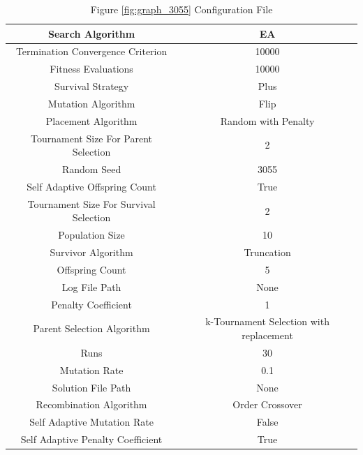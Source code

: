 \documentclass{standalone}
\begin{document}
\begin{table}[!htb]
	\centering
	\caption{Figure \ref{fig:graph_3055} Configuration File}
	\label{tab:graph_3055}
	\begin{tabular}{| c | c |}
		\hline
		Search Algorithm		& EA		 \\
		\hline
		Termination Convergence Criterion		& 10000		 \\
		\hline
		Fitness Evaluations		& 10000		 \\
		\hline
		Survival Strategy		& Plus		 \\
		\hline
		Mutation Algorithm		& Flip		 \\
		\hline
		Placement Algorithm		& Random with Penalty		 \\
		\hline
		Tournament Size For Parent Selection		& 2		 \\
		\hline
		Random Seed		& 3055		 \\
		\hline
		Self Adaptive Offspring Count		& True		 \\
		\hline
		Tournament Size For Survival Selection		& 2		 \\
		\hline
		Population Size		& 10		 \\
		\hline
		Survivor Algorithm		& Truncation		 \\
		\hline
		Offspring Count		& 5		 \\
		\hline
		Log File Path		& None		 \\
		\hline
		Penalty Coefficient		& 1		 \\
		\hline
		Parent Selection Algorithm		& k-Tournament Selection with replacement		 \\
		\hline
		Runs		& 30		 \\
		\hline
		Mutation Rate		& 0.1		 \\
		\hline
		Solution File Path		& None		 \\
		\hline
		Recombination Algorithm		& Order Crossover		 \\
		\hline
		Self Adaptive Mutation Rate		& False		 \\
		\hline
		Self Adaptive Penalty Coefficient		& True		 \\
		\hline
	\end{tabular}
\end{table}
\end{document}
